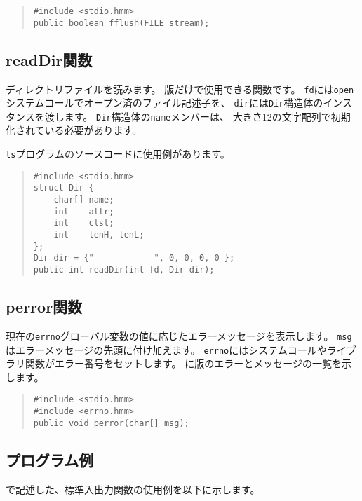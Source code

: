 \begin{quote}
\begin{verbatim}
#include <stdio.hmm>
public boolean fflush(FILE stream);
\end{verbatim}
\end{quote}

\subsection{readDir関数}
\label{chap4:readDir}

ディレクトリファイルを読みます。
{\tacos}版だけで使用できる関数です。
\verb/fd/には\verb/open/システムコールでオープン済のファイル記述子を、
\verb/dir/には\verb/Dir/構造体のインスタンスを渡します。
\verb/Dir/構造体の\verb/name/メンバーは、
大きさ12の文字配列で初期化されている必要があります。

\verb/ls/プログラムのソースコードに使用例があります。

\begin{quote}
\begin{verbatim}
#include <stdio.hmm>
struct Dir {
    char[] name;
    int    attr;
    int    clst;
    int    lenH, lenL;
};
Dir dir = {"            ", 0, 0, 0, 0 };
public int readDir(int fd, Dir dir);
\end{verbatim}
\end{quote}

\subsection{perror関数}

現在の\verb/errno/グローバル変数の値に応じたエラーメッセージを表示します。
\verb/msg/はエラーメッセージの先頭に付け加えます。
\verb/errno/にはシステムコールやライブラリ関数がエラー番号をセットします。
に\tac 版のエラーとメッセージの一覧を示します。

\begin{quote}
\begin{verbatim}
#include <stdio.hmm>
#include <errno.hmm>
public void perror(char[] msg);
\end{verbatim}
\end{quote}

\subsection{プログラム例}

\cmml で記述した、標準入出力関数の使用例を以下に示します。

